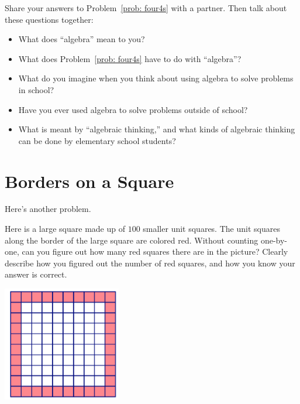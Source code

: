 \bigskip
\bigskip

\begin{thinkpair*}
Share your answers to Problem~\ref{prob: four4s} with a partner.  Then talk about these questions together:
\begin{itemize}
\item
What does ``algebra'' mean to you?  \\
\item
What does Problem~\ref{prob: four4s}  have to do with ``algebra''?\\
\item
What do you imagine when you think about using algebra to solve problems in school?  \\
\item
Have you ever used algebra to solve problems outside of school?\\
\item
What is meant by ``algebraic thinking,'' and what kinds of algebraic thinking can be done by elementary school students?
\end{itemize}
\end{thinkpair*} 

\newpage



\section{Borders on a Square}
Here's another problem.


\begin{problem}\label{prob: border}
Here is a large square made up of $100$ smaller unit squares.  The unit squares along the border of the large square are colored red.  Without counting one-by-one, can you figure out how many red squares there are in the picture?
Clearly describe how you figured out the number of red squares, and how you know your answer is correct.

\bigskip
\bigskip


\begin{center}
\includegraphics[height=5cm]{border1}
\end{center}
\end{problem}


